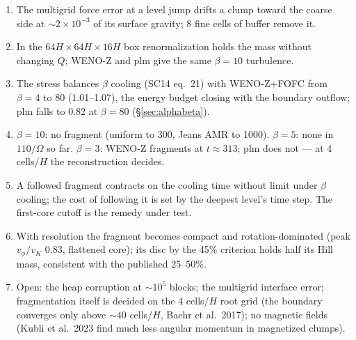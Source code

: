 \documentclass[11pt]{article}
\newcommand{\Om}{\Omega}
\begin{document}
\begin{enumerate}
\item The multigrid force error at a level jump drifts a clump toward the coarse side at
  $\sim2\times10^{-3}$ of its surface gravity; 8 fine cells of buffer remove it.
\item In the $64H\times64H\times16H$ box renormalization holds the mass without changing
  $Q$; WENO-Z and plm give the same $\beta = 10$ turbulence.
\item The stress balances $\beta$ cooling (SC14 eq.~21) with WENO-Z+FOFC from $\beta = 4$ to
  80 (1.01--1.07), the energy budget closing with the boundary outflow; plm falls to 0.82
  at $\beta = 80$ (\S\ref{sec:alphabeta}).
\item $\beta = 10$: no fragment (uniform to 300, Jeans AMR to 1000). $\beta = 5$: none in
  $110/\Om$ so far. $\beta = 3$: WENO-Z fragments at $t\approx313$; plm does not ---
  at 4 cells/$H$ the reconstruction decides.
\item A followed fragment contracts on the cooling time without limit under $\beta$
  cooling; the cost of following it is set by the deepest level's time step. The
  first-core cutoff is the remedy under test.
\item With resolution the fragment becomes compact and rotation-dominated (peak
  $v_\phi/v_K$ 0.83, flattened core); its disc by the 45\% criterion holds half its
  Hill mass, consistent with the published 25--50\%.
\item Open: the heap corruption at $\sim10^5$ blocks; the multigrid interface error;
  fragmentation itself is decided on the 4 cells/$H$ root grid (the boundary converges
  only above $\sim40$ cells/$H$, Baehr et al.\ 2017); no magnetic fields (Kubli et al.\
  2023 find much less angular momentum in magnetized clumps).
\end{enumerate}
\end{document}
